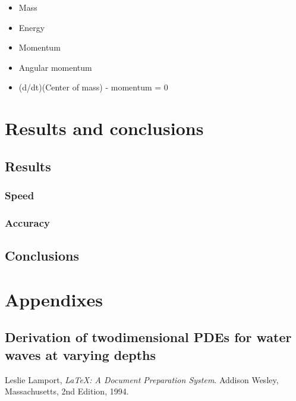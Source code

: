 \documentclass[a4paper]{report}
\begin{document}
\begin{itemize}
    \item Mass
    \item Energy
    \item Momentum
    \item Angular momentum
    \item (d/dt)(Center of mass) - momentum = 0
\end{itemize}


\part{Results and conclusions}

\chapter{Results}

\section{Speed}

\section{Accuracy}

\chapter{Conclusions}


\part{Appendixes}

\appendix
\chapter{Derivation of twodimensional PDEs for water waves at varying depths}

\begin{thebibliography}{99}
    
    Leslie Lamport,
    \emph{\LaTeX: A Document Preparation System}.
    Addison Wesley, Massachusetts,
    2nd Edition,
    1994.
    
\end{thebibliography}
\end{document}

